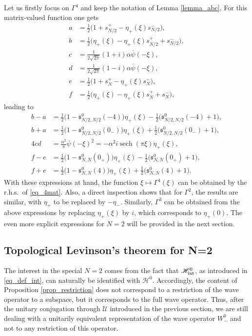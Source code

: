 \documentclass[11pt]{article}
\def\Hrond{\mathscr H}
\def\s{\mathfrak s}
\def\U{\mathcal U}
\def\sech{\mathop{\mathrm{sech}}\nolimits}
\begin{document}
Let us firstly focus on $\Gamma^4$ and keep the notation of Lemma \ref{lemma_abc}.
For this matrix-valued function one gets
\begin{align*}
    a&=\tfrac{1}{2}\big(1+s_{N/2}^+-\eta_+(\xi)s_{N/2}^-\big),\\
    b&=\tfrac{1}{2}\big(\eta_+(\xi) -\eta_+(\xi)s_{N/2}^++s_{N/2}^-\big),\\
    c&=\tfrac{1}{2\sqrt{2\pi}}(1+i)\alpha \overline{\psi}(-\xi), \\
    d&=\tfrac{1}{2\sqrt{2\pi}}(1-i)\alpha \overline{\psi}(-\xi),\\
    e&=\tfrac{1}{2}\big(1+s_{N}^+-\eta_+(\xi)s_{N}^-\big),\\
    f&=\tfrac{1}{2}\big(\eta_+(\xi) -\eta_+(\xi)s_{N}^++s_{N}^-\big),
\end{align*}
leading to 
\begin{align*}
   b-a&=\tfrac{1}{2}\big(1-\s^0_{N/2,N/2}(-4)\big)\eta_+(\xi) -\tfrac{1}{2}\big(\s^0_{N/2,N/2}(-4)+1\big),\\
   b+a&=\tfrac{1}{2}\big(1-\s^0_{N/2,N/2}(0_-)\big)\eta_+(\xi) +\tfrac{1}{2}\big(\s^0_{N/2,N/2}(0_-)+1\big),\\
   4cd&=\tfrac{\alpha^2}{\pi}\overline{\psi}(-\xi)^2=-\alpha^2 i \sech(\pi \xi)\eta_+(\xi),\\
   f-e&=\tfrac{1}{2}\big(1-\s^0_{N,N}(0_+)\big)\eta_+(\xi) -\tfrac{1}{2}\big(\s^0_{N,N}(0_+)+1\big),\\
   f+e&=\tfrac{1}{2}\big(1-\s^0_{N,N}(4)\big)\eta_+(\xi) +\tfrac{1}{2}\big(\s^0_{N,N}(4)+1\big).
\end{align*}
With these expressions at hand, the function $\xi\mapsto \Gamma^4(\xi)$
can be obtained by the r.h.s.~of \eqref{eq_4mat}.
Also, a direct inspection shows that for $\Gamma^2$, the results are similar, with $\eta_+$
to be replaced by $-\eta_-$. Similarly, $\Gamma^3$ can be obtained from the above expressions
by replacing $\eta_+(\xi)$ by $i$, which corresponds to $\eta_+(0)$.
The even more explicit expressions for $N=2$ will be provided in the next section.

\subsection{Topological Levinson's theorem for N=2}\label{sec_top_N2}

The interest in the special $N=2$ comes from the fact that $\Hrond^0_{\rm int}$, 
as introduced in \eqref{eq_def_int}, can naturally be identified with $\Hrond^0$.
Accordingly, the content of Proposition \ref{prop_restriction} does not correspond to
a restriction of the wave operator to a subspace, but it corresponds to the full wave operator.
Thus, after the unitary conjugation through $\U$ introduced in the previous section,
we are still dealing with a unitarily equivalent representation of the wave operator $W_-^0$
and not to any restriction of this operator.
\end{document}
